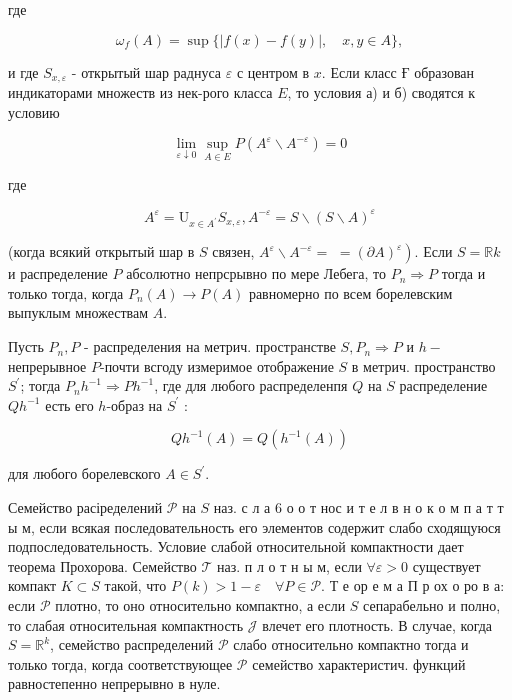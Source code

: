 \documentclass[10pt]{article}
\begin{document}
где



\[

\omega_{f}(A)=\sup \{|f(x)-f(y)|, \quad x, y \in A\},

\]



и где $S_{x, \varepsilon}$ - открытый шар раднуса $\varepsilon$ с центром в $x$. Если класс Ғ образован индикаторами множеств из нек-рого класса $E$, то условия а) и б) сводятся к условию



\[

\lim _{\varepsilon \downarrow 0} \sup _{A \in E} P\left(A^{\varepsilon} \backslash A^{-\varepsilon}\right)=0

\]



где



\[

A^{\varepsilon}=\mathrm{U}_{x \in A^{\prime}} S_{x, \varepsilon}, A^{-\varepsilon}=S \backslash(S \backslash A)^{\varepsilon}

\]



(когда всякий открытый шар в $S$ связен, $A^{\varepsilon} \backslash A^{-\varepsilon}=$ $\left.=(\partial A)^{\varepsilon}\right)$. Если $S=\mathbb{R} k$ и распределение $P$ абсолютно непрсрывно по мере Лебега, то $P_{n} \Rightarrow P$ тогда и только тогда, когда $P_{n}(A) \rightarrow P(A)$ равномерно по всем борелевским выпуклым множествам $A$.



Пусть $P_{n}, P$ - распределения на метрич. пространстве $S, P_{n} \Rightarrow P$ и $h-$ непрерывное $P$-почти всгоду измеримое отображение $S$ в метрич. пространство $S^{\prime}$; тогда $P_{n} h^{-1} \Rightarrow P h^{-1}$, где для любого распределенпя $Q$ на $S$ распределение $Q h^{-1}$ есть его $h$-образ на $S^{\prime}$ :



\[

Q h^{-1}(A)=Q\left(h^{-1}(A)\right)

\]



для любого борелевского $A \in S^{\prime}$.



Семейство расіределений $\mathscr{P}$ на $S$ наз. с л а 6 о о т нос и т е л в н о к о м п а т т ы м, если всякая последовательность его элементов содержит слабо сходящуюся подпоследовательность. Условие слабой относительной компактности дает теорема Прохорова. Семейство $\mathscr{T}$ наз. п л о т н ы м, если $\forall \varepsilon>0$ существует компакт $K \subset S$ такой, что $P(k)>1-\varepsilon \quad \forall P \in \mathscr{\mathcal { P }}$. Т е ор е м а П р ох о ро в а: если $\mathscr{P}$ плотно, то оно относительно компактно, а если $S$ сепарабельно и полно, то слабая относительная компактность $\mathscr{\mathcal { J }}$ влечет его плотность. В случае, когда $S=\mathbb{R}^{k}$, семейство распределений $\mathscr{P}$ слабо относительно компактно тогда и только тогда, когда соответствующее $\mathscr{P}$ семейство характеристич. функций равностепенно непрерывно в нуле.
\end{document}
